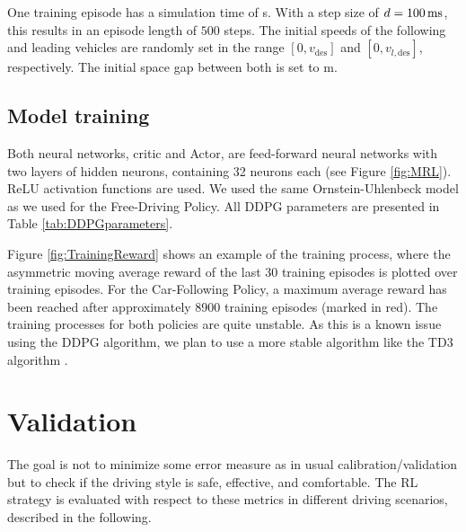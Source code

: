 \documentclass[review]{elsarticle}
\providecommand{\martin}[1]{#1}                  %
\providecommand{\sub}[1]{_{\mathrm{#1}}}  %
\providecommand{\3}{{\ss}}
\begin{document}
One \martin{training} episode has a simulation time of \unit[50]{s}.  With a step size of
$d=\unit[100]{ms}$, this results in an episode length of $500$
steps. The initial speeds of the following and leading vehicles are
randomly set in the range $[0,v\sub{des}]$ and $[0,v_{l,\text{des}}]$,
respectively. The initial space gap between both is set to \unit[120]{m}. 

\subsection{Model training}
Both neural networks, critic and Actor, are feed-forward neural networks with two layers of hidden neurons, containing 32 neurons each (see Figure \ref{fig:MRL}). ReLU activation functions are used. We used the same Ornstein-Uhlenbeck model as we used for the Free-Driving Policy.
All DDPG parameters are presented in Table \ref{tab:DDPGparameters}.

Figure \ref{fig:TrainingReward} shows an example of the training
process, where the asymmetric moving average reward of the last 30
training episodes is plotted over training episodes. For the
Car-Following Policy, a maximum average reward has been reached after
approximately 8900 training episodes (marked in red). The training processes for both policies are quite unstable. As this is a known issue using the DDPG algorithm, we plan to use a more stable algorithm like the TD3 algorithm \citep{TD3}.    








\section{Validation}
\label{sec:validation}
The goal is not to minimize some error measure as in usual
calibration/validation but to check if the driving style is safe,
effective, and comfortable. The RL strategy is evaluated with respect to these metrics in different driving scenarios, described in the following.
\end{document}
